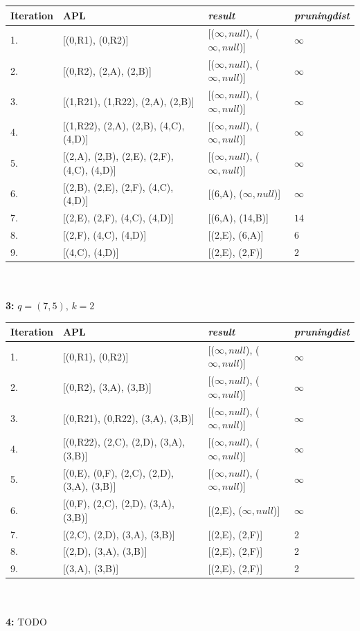     \begin{tabular}{l|l|l|l}
        Iteration   & APL               & \textit{result}                                               & \textit{pruningdist} \\
        \toprule
        1. & [(0,R1), (0,R2)] & [(\(\infty, null\)), (\(\infty, null\))] & \(\infty\) \\
        2. & [(0,R2), (2,A), (2,B)] & [(\(\infty, null\)), (\(\infty, null\))] & \(\infty\) \\
        3. & [(1,R21), (1,R22), (2,A), (2,B)] & [(\(\infty, null\)), (\(\infty, null\))] & \(\infty\) \\
        4. & [(1,R22), (2,A), (2,B), (4,C), (4,D)] & [(\(\infty, null\)), (\(\infty, null\))] & \(\infty\) \\
        5. & [(2,A), (2,B), (2,E), (2,F), (4,C), (4,D)] & [(\(\infty, null\)), (\(\infty, null\))] & \(\infty\) \\
        6. & [(2,B), (2,E), (2,F), (4,C), (4,D)] & [(6,A), (\(\infty, null\))] & \(\infty\) \\
        7. & [(2,E), (2,F), (4,C), (4,D)] & [(6,A), (14,B)] & \(14\) \\
        8. & [(2,F), (4,C), (4,D)] & [(2,E), (6,A)] & \(6\) \\
        9. & [(4,C), (4,D)] & [(2,E), (2,F)] & \(2\) \\
    \end{tabular}
    \\
    \\
    \textbf{3:} \(q=(7,5)\), \(k=2\)\\
    \begin{tabular}{l|l|l|l}
        Iteration   & APL               & \textit{result}                                               & \textit{pruningdist} \\
        \toprule
        1. & [(0,R1), (0,R2)] & [(\(\infty, null\)), (\(\infty, null\))] & \(\infty\) \\
        2. & [(0,R2), (3,A), (3,B)] & [(\(\infty, null\)), (\(\infty, null\))] & \(\infty\) \\
        3. & [(0,R21), (0,R22), (3,A), (3,B)] & [(\(\infty, null\)), (\(\infty, null\))] & \(\infty\) \\
        4. & [(0,R22), (2,C), (2,D), (3,A), (3,B)] & [(\(\infty, null\)), (\(\infty, null\))] & \(\infty\) \\
        5. & [(0,E), (0,F), (2,C), (2,D), (3,A), (3,B)] & [(\(\infty, null\)), (\(\infty, null\))] & \(\infty\) \\
        6. & [(0,F), (2,C), (2,D), (3,A), (3,B)] & [(2,E), (\(\infty, null\))] & \(\infty\) \\
        7. & [(2,C), (2,D), (3,A), (3,B)] & [(2,E), (2,F)] & 2 \\
        8. & [(2,D), (3,A), (3,B)] &  [(2,E), (2,F)] & 2 \\
        9. & [(3,A), (3,B)] & [(2,E), (2,F)] & 2 \\
    \end{tabular}
    \\
    \\
    \textbf{4: } TODO

